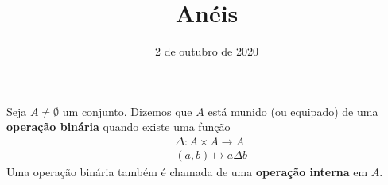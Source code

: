 \documentclass{beamer}
\title{An\'eis}
\author[\autor]{\autor}
\institute[\instituto]{\instituto}
\date{2 de outubro de 2020}
\begin{document}
    \begin{frame}
        \maketitle
    \end{frame}

    
    \begin{frame}
        \begin{definicao}
            Seja $A \ne \emptyset$ um conjunto. \pause Dizemos que $A$ est{\'a} munido \pause (ou equipado) \pause de uma \textbf{opera{\c c}{\~a}o bin{\'a}ria} \pause quando existe uma fun{\c c}{\~a}o\pause
            \begin{align*}
                &\Delta : A \times A \to A\\
                &(a,b) \longmapsto a\Delta b        
            \end{align*}
            Uma opera{\c c}{\~a}o bin{\'a}ria tamb{\'e}m {\'e} chamada de uma \textbf{opera{\c c}{\~a}o interna} em $A$.\pause
        \end{definicao}
    \end{frame}
\end{document}
